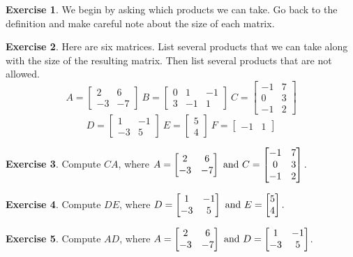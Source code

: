 \documentclass[handout]{beamer}
\newcommand{\fn}{\insertframenumber}
\theoremstyle{definition}
\newtheorem{exercise}{Exercise}
\begin{document}
\begin{frame}{\fn}
	\begin{exercise}
		We begin by asking which products we can take.  Go back to the definition and make careful note about the size of each matrix.
	\end{exercise}
	\pause
	\begin{exercise}
		Here are six matrices.  List several products that we can take along with the size of the resulting matrix.  Then list several products that are not allowed.
		\[A=\begin{bmatrix}2&6\\-3&-7\end{bmatrix}\
		B=\begin{bmatrix}0&1&-1\\3&-1&1\end{bmatrix}\
		C=\begin{bmatrix}-1&7\\0&3\\-1&2\end{bmatrix}
		\]
		\[
		D=\begin{bmatrix}1&-1\\-3&5\end{bmatrix}\
		E=\begin{bmatrix}5\\4\end{bmatrix}\
		F=\begin{bmatrix}-1&1\end{bmatrix}
		\]
	\end{exercise}
\end{frame}

\begin{frame}{\fn}
	\begin{exercise}
		Compute $CA$, where
		$A=\begin{bmatrix}2&6\\-3&-7\end{bmatrix}\textup{ and }
		C=\begin{bmatrix}-1&7\\0&3\\-1&2\end{bmatrix}.$\vskip 3in
	\end{exercise}
	\begin{exercise}
		Compute $DE$, where
		$D=\begin{bmatrix}1&-1\\-3&5\end{bmatrix}\textup{ and }
		E=\begin{bmatrix}5\\4\end{bmatrix}.$\vskip 3in
	\end{exercise}
	\begin{exercise}
		Compute $AD$, where
		$A=\begin{bmatrix}2&6\\-3&-7\end{bmatrix}\textup{ and }
		D=\begin{bmatrix}1&-1\\-3&5\end{bmatrix}$.
	\end{exercise}
\end{frame}
\end{document}
